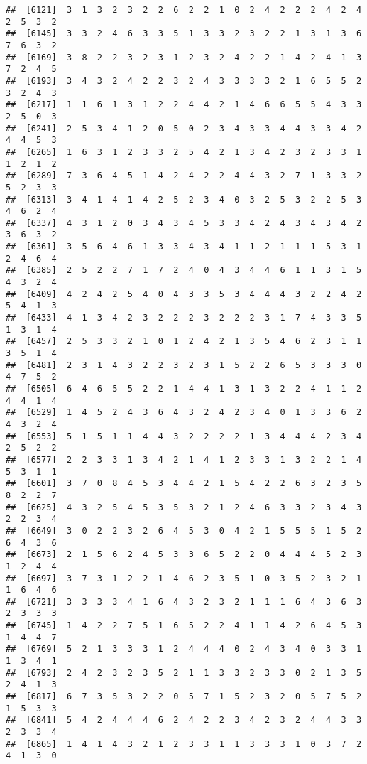 \documentclass[
]{article}
\begin{document}
\begin{verbatim}
##  [6121]  3  1  3  2  3  2  2  6  2  2  1  0  2  4  2  2  2  4  2  4  2  5  3  2
##  [6145]  3  3  2  4  6  3  3  5  1  3  3  2  3  2  2  1  3  1  3  6  7  6  3  2
##  [6169]  3  8  2  2  3  2  3  1  2  3  2  4  2  2  1  4  2  4  1  3  7  2  4  5
##  [6193]  3  4  3  2  4  2  2  3  2  4  3  3  3  3  2  1  6  5  5  2  3  2  4  3
##  [6217]  1  1  6  1  3  1  2  2  4  4  2  1  4  6  6  5  5  4  3  3  2  5  0  3
##  [6241]  2  5  3  4  1  2  0  5  0  2  3  4  3  3  4  4  3  3  4  2  4  4  5  3
##  [6265]  1  6  3  1  2  3  3  2  5  4  2  1  3  4  2  3  2  3  3  1  1  2  1  2
##  [6289]  7  3  6  4  5  1  4  2  4  2  2  4  4  3  2  7  1  3  3  2  5  2  3  3
##  [6313]  3  4  1  4  1  4  2  5  2  3  4  0  3  2  5  3  2  2  5  3  4  6  2  4
##  [6337]  4  3  1  2  0  3  4  3  4  5  3  3  4  2  4  3  4  3  4  2  3  6  3  2
##  [6361]  3  5  6  4  6  1  3  3  4  3  4  1  1  2  1  1  1  5  3  1  2  4  6  4
##  [6385]  2  5  2  2  7  1  7  2  4  0  4  3  4  4  6  1  1  3  1  5  4  3  2  4
##  [6409]  4  2  4  2  5  4  0  4  3  3  5  3  4  4  4  3  2  2  4  2  5  4  1  3
##  [6433]  4  1  3  4  2  3  2  2  2  3  2  2  2  3  1  7  4  3  3  5  1  3  1  4
##  [6457]  2  5  3  3  2  1  0  1  2  4  2  1  3  5  4  6  2  3  1  1  3  5  1  4
##  [6481]  2  3  1  4  3  2  2  3  2  3  1  5  2  2  6  5  3  3  3  0  4  7  5  2
##  [6505]  6  4  6  5  5  2  2  1  4  4  1  3  1  3  2  2  4  1  1  2  4  4  1  4
##  [6529]  1  4  5  2  4  3  6  4  3  2  4  2  3  4  0  1  3  3  6  2  4  3  2  4
##  [6553]  5  1  5  1  1  4  4  3  2  2  2  2  1  3  4  4  4  2  3  4  2  5  2  2
##  [6577]  2  2  3  3  1  3  4  2  1  4  1  2  3  3  1  3  2  2  1  4  5  3  1  1
##  [6601]  3  7  0  8  4  5  3  4  4  2  1  5  4  2  2  6  3  2  3  5  8  2  2  7
##  [6625]  4  3  2  5  4  5  3  5  3  2  1  2  4  6  3  3  2  3  4  3  2  2  3  4
##  [6649]  3  0  2  2  3  2  6  4  5  3  0  4  2  1  5  5  5  1  5  2  6  4  3  6
##  [6673]  2  1  5  6  2  4  5  3  3  6  5  2  2  0  4  4  4  5  2  3  1  2  4  4
##  [6697]  3  7  3  1  2  2  1  4  6  2  3  5  1  0  3  5  2  3  2  1  1  6  4  6
##  [6721]  3  3  3  3  4  1  6  4  3  2  3  2  1  1  1  6  4  3  6  3  2  3  3  3
##  [6745]  1  4  2  2  7  5  1  6  5  2  2  4  1  1  4  2  6  4  5  3  1  4  4  7
##  [6769]  5  2  1  3  3  3  1  2  4  4  4  0  2  4  3  4  0  3  3  1  1  3  4  1
##  [6793]  2  4  2  3  2  3  5  2  1  1  3  3  2  3  3  0  2  1  3  5  2  4  1  3
##  [6817]  6  7  3  5  3  2  2  0  5  7  1  5  2  3  2  0  5  7  5  2  1  5  3  3
##  [6841]  5  4  2  4  4  4  6  2  4  2  2  3  4  2  3  2  4  4  3  3  2  3  3  4
##  [6865]  1  4  1  4  3  2  1  2  3  3  1  1  3  3  3  1  0  3  7  2  4  1  3  0

\end{verbatim}
\end{document}
